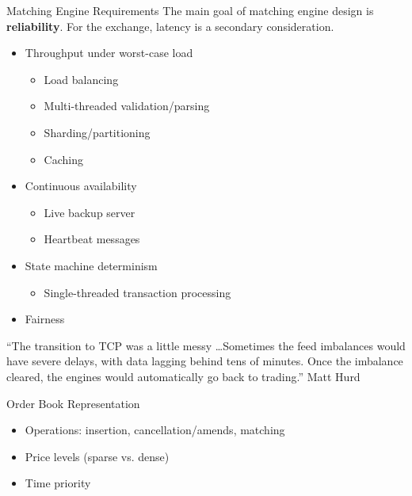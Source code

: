 \documentclass{beamer}
\begin{document}
\begin{frame}{Matching Engine Requirements}
	The main goal of matching engine design is \textbf{reliability}. For the exchange, latency is a secondary consideration.
	\begin{itemize}
		\item Throughput under worst-case load
		\begin{itemize}
			\item Load balancing
			\item Multi-threaded validation/parsing
			\item Sharding/partitioning %
			\item Caching
		\end{itemize}
		\item Continuous availability
		\begin{itemize}
			\item Live backup server
			\item Heartbeat messages
		\end{itemize}
		\item State machine determinism
		\begin{itemize}
			\item Single-threaded transaction processing
		\end{itemize}
		\item Fairness
	\end{itemize}
	\begin{block}{}
		``The transition to TCP was a little messy \ldots Sometimes the feed imbalances would have severe delays, with data lagging behind tens of minutes. Once the imbalance cleared, the engines would automatically go back to trading.'' Matt Hurd
	\end{block}
\end{frame}

\begin{frame}{Order Book Representation}
	\begin{itemize}
		\item Operations: insertion, cancellation/amends, matching
		\item Price levels (sparse vs. dense)
		\item Time priority
	\end{itemize}
\end{frame}

\end{document}
